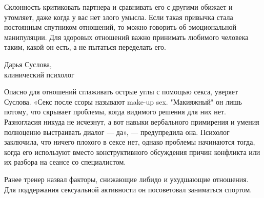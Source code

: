 \begin{fancyquotes}
    Склонность критиковать партнера и сравнивать его с другими обижает и утомляет, даже когда у вас нет злого умысла. Если такая привычка стала постоянным спутником отношений, то можно говорить об эмоциональной манипуляции. Для здоровых отношений важно принимать любимого человека таким, какой он есть, а не пытаться переделать его.

    \begin{flushright}
        Дарья Суслова,\\
        клинический психолог
    \end{flushright}
\end{fancyquotes}

Опасно для отношений сглаживать острые углы с помощью секса, уверяет Суслова. «Секс после ссоры называют make-up sex. "Макияжный" он лишь потому, что скрывает проблемы, когда видимого решения для них нет. Разногласия никуда не исчезнут, а вот навыки вербального примирения и умения полноценно выстраивать диалог — да», — предупредила она. Психолог заключила, что ничего плохого в сексе нет, однако проблемы начинаются тогда, когда его используют вместо конструктивного обсуждения причин конфликта или их разбора на сеансе со специалистом.

Ранее тренер назвал факторы, снижающие либидо и ухудшающие отношения. Для поддержания сексуальной активности он посоветовал заниматься спортом.
